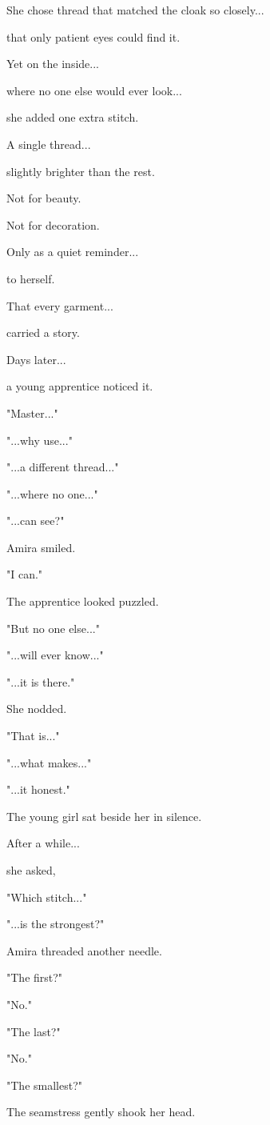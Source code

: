 \documentclass[12pt,openany]{book}
\begin{document}
She chose thread that matched the cloak so closely...

that only patient eyes could find it.

Yet on the inside...

where no one else would ever look...

she added one extra stitch.

A single thread...

slightly brighter than the rest.

Not for beauty.

Not for decoration.

Only as a quiet reminder...

to herself.

That every garment...

carried a story.

Days later...

a young apprentice noticed it.

"Master..."

"...why use..."

"...a different thread..."

"...where no one..."

"...can see?"

Amira smiled.

"I can."

The apprentice looked puzzled.

"But no one else..."

"...will ever know..."

"...it is there."

She nodded.

"That is..."

"...what makes..."

"...it honest."

The young girl sat beside her in silence.

After a while...

she asked,

"Which stitch..."

"...is the strongest?"

Amira threaded another needle.

"The first?"

"No."

"The last?"

"No."

"The smallest?"

The seamstress gently shook her head.
\end{document}
